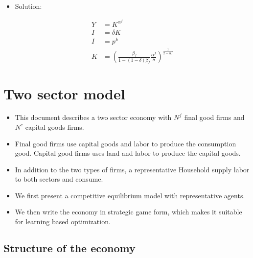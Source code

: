 \documentclass[11pt]{article}
\numberwithin{equation}{section}
\begin{document}
\begin{itemize}
\begin{itemize}
		\item Solution:
		
		\begin{align*}
		Y & =  	K^{\alpha^f}  \\
		I & = \delta K\\
		I & = p^k \\  
		K & =\left(\frac{ \beta_f}{1-(1-\delta)\beta_f}  \frac{\alpha^f}{\delta} \right)^{\frac{1}{2-\alpha^f}}  
		\end{align*}
		
	\end{itemize}
	
	

\end{itemize}


\section{Two sector model}

\begin{itemize}
	\item This document describes a two sector economy with $N^f$ final good firms and $N^c$ capital goods firms. \medskip
	
	\item Final good firms use capital goods and labor to produce the consumption good. Capital good firms uses land and labor to produce the capital goods.  \medskip
	
	\item In addition to the two types of firms, a representative Household supply labor to both sectors and consume. \medskip
	
	\item We first present a competitive equilibrium model with representative agents. \medskip
	
	\item We then write the economy in strategic game form, which makes it suitable for learning based optimization. \medskip
\end{itemize}


\subsection{Structure of the economy}
\end{document}
